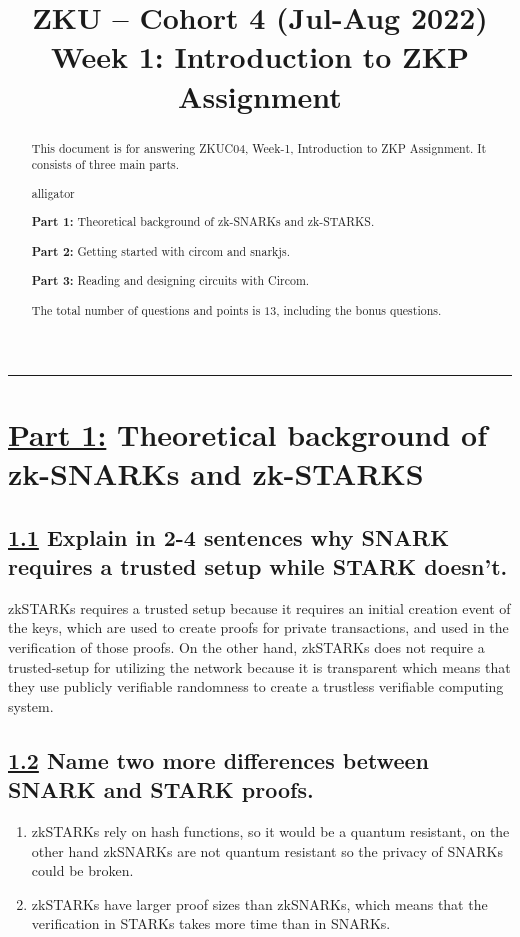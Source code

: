 \documentclass[letterpaper, 10 pt, conference]{ieeeconf}  %
\title{\LARGE \bf
ZKU – Cohort 4 (Jul-Aug 2022)\\Week 1: Introduction to ZKP\\Assignment \sharp 1}
\author{Iskander Andrews$^{1}$%
\thanks{\faIcon[regular]{envelope} \tt\small iskander.s.andrews@gmail.com}
\thanks{\faIcon{discord} \tt\small Isk#0996}
\thanks{\faIcon{github} \tt\small iskdrews}}
\begin{document}
\maketitle
\thispagestyle{empty}
\pagestyle{empty}


\begin{abstract}

This document is for answering ZKUC04, Week-1, Introduction to ZKP Assignment.
It consists of three main parts.
\begin{labeling}{alligator}
\item [\textbf{Part 1:}] Theoretical background of zk-SNARKs and zk-STARKS.
\item [\textbf{Part 2:}] Getting started with circom and snarkjs.
\item [\textbf{Part 3:}] Reading and designing circuits with Circom.
\end{labeling}

The total number of questions and points is $13$, including the bonus questions. 
\end{abstract}

\noindent\rule{8cm}{0.4pt}

\section{\textbf{\underline{Part 1:}} Theoretical background of zk-SNARKs and zk-STARKS}
\subsection{\textbf{\underline{1.1} Explain in 2-4 sentences why SNARK requires a trusted setup while STARK doesn’t.}}

zkSTARKs requires a trusted setup because it requires an initial creation event of the keys, which are used to create proofs for private transactions, and used in the verification of those proofs. \newline On the other hand, zkSTARKs does not require a trusted-setup for utilizing the network because it is transparent which means that they use publicly verifiable randomness to create a trustless verifiable computing system. \cite{c1}\cite{c2}

\subsection{\textbf{\underline{1.2} Name two more differences between SNARK and STARK proofs.}}
\begin{enumerate}
  \item zkSTARKs rely on hash functions, so it would be a quantum resistant, on the other hand zkSNARKs are not quantum resistant so the privacy of SNARKs could be broken. \cite{c1}
  \item zkSTARKs have larger proof sizes than zkSNARKs, which means that the verification in STARKs takes more time than in SNARKs. \cite{c1}
\end{enumerate}
\end{document}
